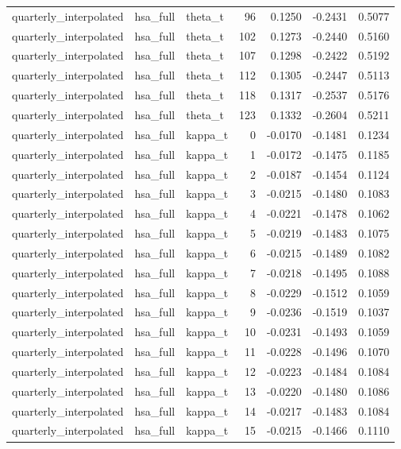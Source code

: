 \begin{tabular}{lllrrrr}
quarterly\_interpolated & hsa\_full & theta\_t & 96 & 0.1250 & -0.2431 & 0.5077 \\
quarterly\_interpolated & hsa\_full & theta\_t & 102 & 0.1273 & -0.2440 & 0.5160 \\
quarterly\_interpolated & hsa\_full & theta\_t & 107 & 0.1298 & -0.2422 & 0.5192 \\
quarterly\_interpolated & hsa\_full & theta\_t & 112 & 0.1305 & -0.2447 & 0.5113 \\
quarterly\_interpolated & hsa\_full & theta\_t & 118 & 0.1317 & -0.2537 & 0.5176 \\
quarterly\_interpolated & hsa\_full & theta\_t & 123 & 0.1332 & -0.2604 & 0.5211 \\
quarterly\_interpolated & hsa\_full & kappa\_t & 0 & -0.0170 & -0.1481 & 0.1234 \\
quarterly\_interpolated & hsa\_full & kappa\_t & 1 & -0.0172 & -0.1475 & 0.1185 \\
quarterly\_interpolated & hsa\_full & kappa\_t & 2 & -0.0187 & -0.1454 & 0.1124 \\
quarterly\_interpolated & hsa\_full & kappa\_t & 3 & -0.0215 & -0.1480 & 0.1083 \\
quarterly\_interpolated & hsa\_full & kappa\_t & 4 & -0.0221 & -0.1478 & 0.1062 \\
quarterly\_interpolated & hsa\_full & kappa\_t & 5 & -0.0219 & -0.1483 & 0.1075 \\
quarterly\_interpolated & hsa\_full & kappa\_t & 6 & -0.0215 & -0.1489 & 0.1082 \\
quarterly\_interpolated & hsa\_full & kappa\_t & 7 & -0.0218 & -0.1495 & 0.1088 \\
quarterly\_interpolated & hsa\_full & kappa\_t & 8 & -0.0229 & -0.1512 & 0.1059 \\
quarterly\_interpolated & hsa\_full & kappa\_t & 9 & -0.0236 & -0.1519 & 0.1037 \\
quarterly\_interpolated & hsa\_full & kappa\_t & 10 & -0.0231 & -0.1493 & 0.1059 \\
quarterly\_interpolated & hsa\_full & kappa\_t & 11 & -0.0228 & -0.1496 & 0.1070 \\
quarterly\_interpolated & hsa\_full & kappa\_t & 12 & -0.0223 & -0.1484 & 0.1084 \\
quarterly\_interpolated & hsa\_full & kappa\_t & 13 & -0.0220 & -0.1480 & 0.1086 \\
quarterly\_interpolated & hsa\_full & kappa\_t & 14 & -0.0217 & -0.1483 & 0.1084 \\
quarterly\_interpolated & hsa\_full & kappa\_t & 15 & -0.0215 & -0.1466 & 0.1110 \\

\end{tabular}
